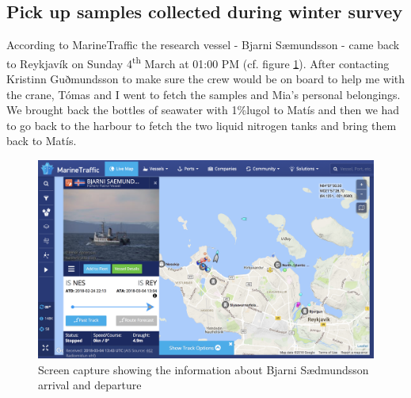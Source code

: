 \subsection{Pick up samples collected during winter survey}
\label{task:20180305_cj0}

According to MarineTraffic the research vessel - Bjarni Sæmundsson - came back to Reykjavík on Sunday 4\textsuperscript{th} March at 01:00 PM (cf. figure \ref{fig:20180305_marine_traffic_bjarni}). After contacting Kristinn Guðmundsson to make sure the crew would be on board to help me with the crane, Tómas and I went to fetch the samples and Mia's personal belongings. We brought back the bottles of seawater with 1\%lugol to Matís and then we had to go back to the harbour to fetch the two liquid nitrogen tanks and bring them back to Matís.

\begin{figure}[htp] %
    \centering
    \caption{Screen capture showing the information about Bjarni Sædmundsson arrival and departure}
    \label{fig:20180305_marine_traffic_bjarni}
    \includegraphics[width=\textwidth]{graphics/screenshots/20180305_marine_traffic_bjarni.png}
\end{figure}